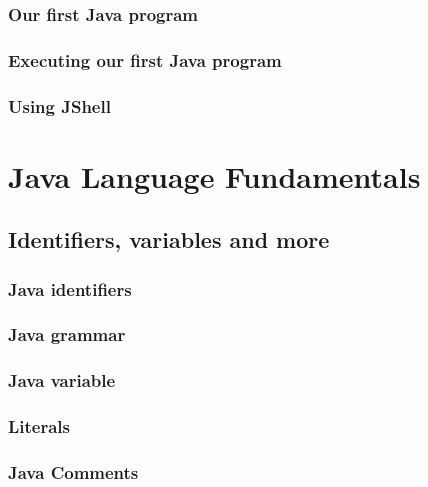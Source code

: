 \documentclass[14pt,fleqn]{extbook} %
\begin{document}
\subsection{Our first Java program}

\subsection{Executing our first Java program}
%

\subsection{Using JShell}




\chapter{Java Language Fundamentals}
\section{Identifiers, variables and more}
%
\subsection{Java identifiers}

\subsection{Java grammar}

\subsection{Java variable}

\subsection{Literals}

\subsection{Java Comments}

\end{document}
